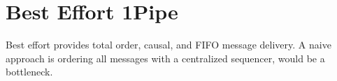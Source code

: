 \section{Best Effort 1Pipe}
\label{sec:unreliable}


Best effort \sys{} provides total order, causal, and FIFO message delivery.
A naive approach  is ordering all messages with a centralized sequencer,  would be a bottleneck. 










